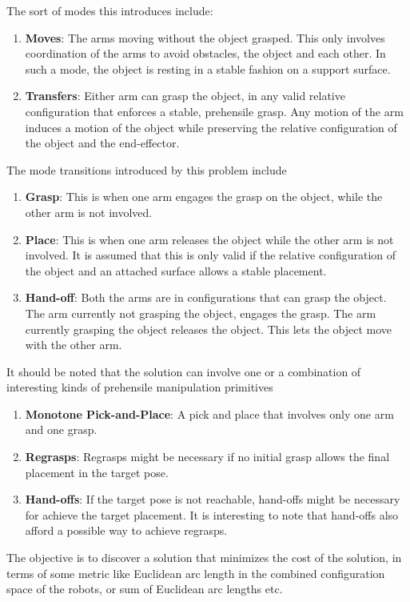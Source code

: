 The sort of modes this introduces include:
\begin{enumerate}
\item \textbf{Moves}: The arms moving without the object grasped. This only involves coordination of the arms to avoid obstacles, the object and each other. In such a mode, the object is resting in a stable fashion on a support surface.
\item \textbf{Transfers}: Either arm can grasp the object, in any valid relative configuration that enforces a stable, prehensile grasp. Any motion of the arm induces a motion of the object while preserving the relative configuration of the object and the end-effector. 
\end{enumerate}

The mode transitions introduced by this problem include
\begin{enumerate}
\item \textbf{Grasp}: This is when one arm engages the grasp on the object, while the other arm is not involved.
\item \textbf{Place}: This is when one arm releases the object while the other arm is not involved. It is assumed that this is only valid if the relative configuration of the object and an attached surface allows a stable placement.
\item \textbf{Hand-off}: Both the arms are in configurations that can grasp the object. The arm currently not grasping the object, engages the grasp. The arm currently grasping the object releases the object. This lets the object move with the other arm.
\end{enumerate}


It should be noted that the solution can involve one or a combination of interesting kinds of prehensile manipulation primitives
\begin{enumerate}
\item \textbf{Monotone Pick-and-Place}: A pick and place that involves only one arm and one grasp.
\item \textbf{Regrasps}: Regrasps might be necessary if no initial grasp allows the final placement in the target pose.
\item \textbf{Hand-offs}: If the target pose is not reachable, hand-offs might be necessary for achieve the target placement. It is interesting to note that hand-offs also afford a possible way to achieve regrasps.
\end{enumerate}

The objective is to discover a solution that minimizes the cost of the solution, in terms of some metric like Euclidean arc length in the combined configuration space of the robots, or sum of Euclidean arc lengths etc.

